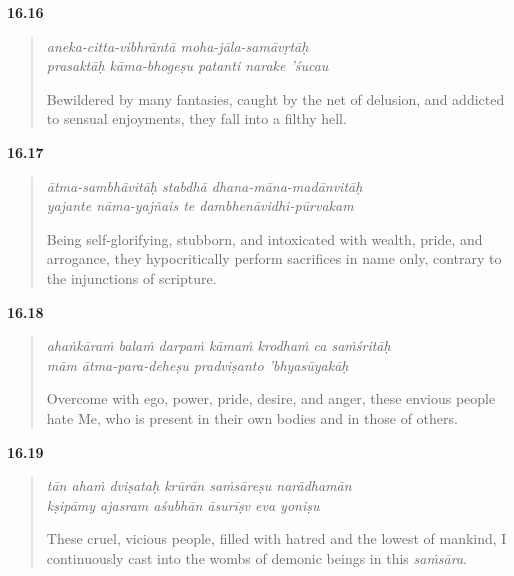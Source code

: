 \par\noindent\textbf{16.16}\par
\begin{verse}
\textit{aneka-citta-vibhrāntā moha-jāla-samāvṛtāḥ} \\
\textit{prasaktāḥ kāma-bhogeṣu patanti narake ’śucau}

\noindent Bewildered by many fantasies, caught by the net of delusion, and addicted to sensual enjoyments, they fall into a filthy hell.
\end{verse}
\par



\par\noindent\textbf{16.17}\par
\begin{verse}
\textit{ātma-sambhāvitāḥ stabdhā dhana-māna-madānvitāḥ} \\
\textit{yajante nāma-yajñais te dambhenāvidhi-pūrvakam}

\noindent Being self-glorifying, stubborn, and intoxicated with wealth, pride, and arrogance, they hypocritically perform sacrifices in name only, contrary to the injunctions of scripture.
\end{verse}
\par



\par\noindent\textbf{16.18}\par
\begin{verse}
\textit{ahaṅkāraṁ balaṁ darpaṁ kāmaṁ krodhaṁ ca saṁśritāḥ} \\
\textit{mām ātma-para-deheṣu pradviṣanto ’bhyasūyakāḥ}

\noindent Overcome with ego, power, pride, desire, and anger, these envious people hate Me, who is present in their own bodies and in those of others.
\end{verse}
\par



\par\noindent\textbf{16.19}\par
\begin{verse}
\textit{tān ahaṁ dviṣataḥ krūrān saṁsāreṣu narādhamān} \\
\textit{kṣipāmy ajasram aśubhān āsurīṣv eva yoniṣu}

\noindent These cruel, vicious people, filled with hatred and the lowest of mankind, I continuously cast into the wombs of demonic beings in this \textit{saṁsāra}.
\end{verse}
\par



